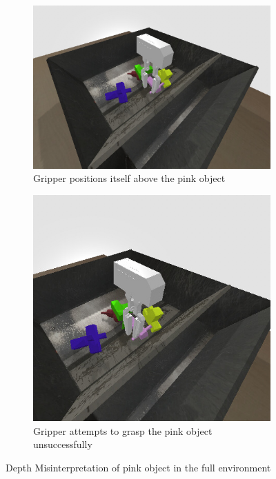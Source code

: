\begin{enumerate}
\begin{figure}[!htbp]
\begin{subfigure}{0.49\textwidth}
                \includegraphics[width=\linewidth]{figures/failure/tablefailure2}
                \caption{Gripper positions itself above the pink object} \label{fig:table}
            \end{subfigure}%
            \hspace*{\fill}   %
            \begin{subfigure}{0.49\textwidth}
                \includegraphics[width=\linewidth]{figures/failure/tablefailure1}
                \caption{Gripper attempts to grasp the pink object unsuccessfully} \label{fig:floor}
            \end{subfigure}%
            \hspace*{\fill}   %
            \caption{ Depth Misinterpretation of pink object in the full environment\label{fig:scenes}}
        \end{figure}


\end{enumerate}

